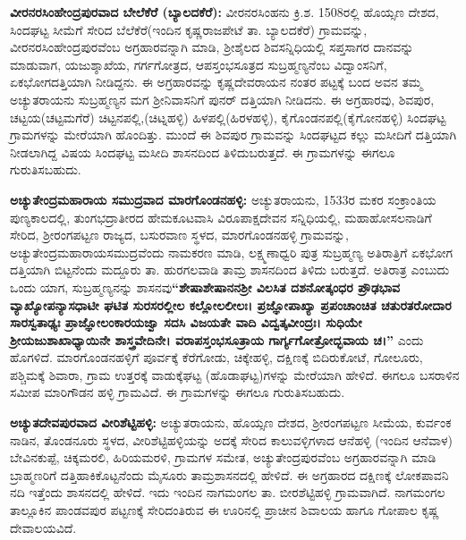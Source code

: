\textbf{ವೀರನರಸಿಂಹೇಂದ್ರಪುರವಾದ ಬೇಲೆಕೆರೆ (ಬ್ಯಾಲದಕೆರೆ): } ವೀರನರಸಿಂಹನು ಕ್ರಿ.ಶ. 1508ರಲ್ಲಿ ಹೊಯ್ಸಣ ದೇಶದ, ಸಿಂದಘಟ್ಟ ಸೀಮೆಗೆ ಸೇರಿದ ಬೆಲೆಕೆರೆ(ಇಂದಿನ ಕೃಷ್ಣರಾಜಪೇಟೆ ತಾ. ಬ್ಯಾಲದಕೆರೆ) ಗ್ರಾಮವನ್ನು, ವೀರನರಸಿಂಹೇಂದ್ರಪುರವೆಂಬ ಅಗ್ರಹಾರವನ್ನಾಗಿ ಮಾಡಿ, ಶ‍್ರೀಶೈಲದ ಶಿವಸನ್ನಿಧಿಯಲ್ಲಿ ಸಪ್ತಸಾಗರ ದಾನವನ್ನು ಮಾಡುವಾಗ, ಯಜುಶ್ಶಾಖೆಯ, ಗರ್ಗಗೋತ್ರದ, ಆಪಸ್ತಂಭ\-ಸೂತ್ರದ ಸುಬ್ರಹ್ಮಣ್ಯನೆಂಬ ವಿದ್ವಾಂಸನಿಗೆ, ಏಕಭೋಗದತ್ತಿಯಾಗಿ ನೀಡಿದ್ದನು. ಈ ಅಗ್ರಹಾರವನ್ನು ಕೃಷ್ಣದೇವರಾಯನ ನಂತರ ಪಟ್ಟಕ್ಕೆ ಬಂದ ಅವನ ತಮ್ಮ ಅಚ್ಯುತರಾಯನು ಸುಬ್ರಹ್ಮಣ್ಯನ ಮಗ ಶ‍್ರೀನಿವಾಸನಿಗೆ ಪುನರ್​ ದತ್ತಿಯಾಗಿ ನೀಡಿದನು. ಈ ಅಗ್ರಹಾರವು, ಶಿವಪುರ, ಚಟ್ಟಯ(ಚಟ್ಟಮಗೆರೆ) ಚಿಟ್ಟನಪಲ್ಲಿ,(ಚಿಟ್ನಹಳ್ಳಿ) ಹಿಳಪಲ್ಲಿ(ಹಿರಳಹಳ್ಳಿ), ಕೈಗೊಂಡನಪಲ್ಲಿ(ಕೈಗೋನಹಳ್ಳಿ) ಸಿಂದಘಟ್ಟ ಗ್ರಾಮಗಳನ್ನು ಮೇರೆಯಾಗಿ ಹೊಂದಿತ್ತು. ಮುಂದೆ ಈ ಶಿವಪುರ ಗ್ರಾಮವನ್ನು ಸಿಂದಘಟ್ಟದ ಕಲ್ಲು ಮಸೀದಿಗೆ ದತ್ತಿಯಾಗಿ ನೀಡಲಾಗಿದ್ದ ವಿಷಯ ಸಿಂದಘಟ್ಟ ಮಸೀದಿ ಶಾಸನದಿಂದ ತಿಳಿದುಬರುತ್ತದೆ. ಈ ಗ್ರಾಮಗಳನ್ನು ಈಗಲೂ ಗುರುತಿಸಬಹುದು.

\textbf{ಅಚ್ಯುತೇಂದ್ರಮಹಾರಾಯ ಸಮುದ್ರವಾದ ಮಾರಗೊಂಡನಹಳ್ಳಿ:} ಅಚ್ಯುತರಾಯನು, 1533ರ ಮಕರ ಸಂಕ್ರಾಂತಿಯ ಪುಣ್ಯಕಾಲದಲ್ಲಿ, ತುಂಗಭದ್ರಾತೀರದ ಹೇಮಕೂಟವಾಸಿ ವಿರೂಪಾಕ್ಷದೇವನ ಸನ್ನಿಧಿಯಲ್ಲಿ, ಮಹಾಹೋಸಲನಾಡಿಗೆ ಸೇರಿದ, ಶ‍್ರೀರಂಗಪಟ್ಟಣ ರಾಜ್ಯದ, ಬಸುರವಾಣ ಸ್ಥಳದ, ಮಾರಗೊಂಡನಹಳ್ಳಿ ಗ್ರಾಮವನ್ನು, ಅಚ್ಯುತೇಂದ್ರಮಹಾರಾಯಸಮುದ್ರ\-ವೆಂದು ನಾಮಕರಣ ಮಾಡಿ, ಲಕ್ಷ್ಮಣಾಧ್ವರಿ ಪುತ್ರ ಸುಬ್ರಹ್ಮಣ್ಯ ಅತಿರಾತ್ರಿಗೆ ಏಕಭೋಗ ದತ್ತಿಯಾಗಿ ಬಿಟ್ಟನೆಂದು ಮದ್ದೂರು ತಾ. ಹುರಗಲವಾಡಿ ತಾಮ್ರ ಶಾಸನದಿಂದ ತಿಳಿದು ಬರುತ್ತದೆ. ಅತಿರಾತ್ರ ಎಂಬುದು ಒಂದು ಯಾಗ, ಸುಬ್ರಹ್ಮಣ್ಯನನ್ನು ಶಾಸನವು\break \textbf{“ಶೇಷಾಶೇಷಾನನಶ‍್ರೀ ವಿಲಸಿತ ದಶನೋತ್ಕಂಧರ ಪ್ರೌಢಭಾವ ವ್ಯಾಖ್ಯೋಪನ್ಯಾಸಧಾಟೀ ಘಟಿತ ಸುರಸರಲ್ಲೀಲ ಕಲ್ಲೋಲಲೀಲಃ। ಪ್ರಜ್ಞೋಪಾಖ್ಯಾ ಪ್ರಪಂಚಾಂಚಿತ ಚತುರತರೋದಾರ ಸಾರಸ್ವತಾಢ್ಯಃ ಪ್ರಾಜ್ಞೋಲಂಕಾರಯಜ್ವಾ ಸದಸಿ ವಿಜಯತೇ ವಾದಿ ವಿದ್ವತ್ಕವೀಂದ್ರಃ। ಸುಧಿಯೇ ಶ‍್ರೀಯಜುಶಾಖಾಧ್ಯಾಯಿನೇ ಶಾಸ್ತ್ರವೇದಿನೇ। ವರಾಪಸ್ತಂಭಸೂತ್ರಾಯ ಗಾರ್ಗ್ಯಗೋತ್ರೋದ್ಭವಾಯ ಚ।”} ಎಂದು ಹೊಗಳಿದೆ. ಮಾರಗೊಂಡನಹಳ್ಳಿಗೆ ಪೂರ್ವಕ್ಕೆ ಕೆರೆಗೋಡು, ಚಿಕ್ಕೇಹಳ್ಳಿ, ದಕ್ಷಿಣಕ್ಕೆ ಬಿದಿರುಕೋಟೆ, ಗೋಲೂರು, ಪಶ್ಚಿಮಕ್ಕೆ ಶಿವಾರಾ, ಗ್ರಾಮ ಉತ್ತರಕ್ಕೆ ವಾಡುಕ್ಕೆಘಟ್ಟ (ಹೊಡಾಘಟ್ಟ)ಗಳನ್ನು ಮೇರೆಯಾಗಿ ಹೇಳಿದೆ. ಈಗಲೂ ಬಸರಾಳಿನ ಸಮೀಪ ಮಾರಿಗೌಡನ ಹಳ್ಳಿ ಗ್ರಾಮವಿದೆ. ಈ ಗ್ರಾಮಗಳನ್ನು ಈಗಲೂ ಗುರುತಿಸಬಹುದು.

\textbf{ಅಚ್ಯುತದೇವಪುರವಾದ ವೀರಿಶೆಟ್ಟಿಹಳ್ಳಿ:} ಅಚ್ಯುತರಾಯನು, ಹೊಯ್ಸಣ ದೇಶದ, ಶ‍್ರೀರಂಗಪಟ್ಟಣ ಸೀಮೆಯ, ಕುರ್ವಂಕ ನಾಡಿನ, ತೊಂಡನೂರು ಸ್ಥಳದ, ವೀರಿಶೆಟ್ಟಿಹಳ್ಳಿಯನ್ನು ಅದಕ್ಕೆ ಸೇರಿದ ಕಾಲುವಳ್ಳಿಗಳಾದ ಆನೆಹಳ್ಳಿ (ಇಂದಿನ ಆನೆವಾಳ) ಬೇವಿನಕುಪ್ಪೆ, ಚಿಕ್ಕಮರಲಿ, ಹಿರಿಯಮರಳಿ, ಗ್ರಾಮಗಳ ಸಮೇತ, ಅಚ್ಯುತೇಂದ್ರಪುರವೆಂಬ ಅಗ್ರಹಾರವನ್ನಾಗಿ ಮಾಡಿ ಬ್ರಾಹ್ಮಣರಿಗೆ ದತ್ತಿಹಾಕಿಕೊಟ್ಟನೆಂದು ಮೈಸೂರು ತಾಮ್ರಶಾಸನದಲ್ಲಿ ಹೇಳಿದೆ. ಈ ಅಗ್ರಹಾರದ ದಕ್ಷಿಣಕ್ಕೆ ಲೋಕಪಾವನಿ ನದಿ ಇತ್ತೆಂದು ಶಾಸನದಲ್ಲಿ ಹೇಳಿದೆ. ಇದು ಇಂದಿನ ನಾಗಮಂಗಲ ತಾ. ಬೀರಶೆಟ್ಟಿಹಳ್ಳಿ ಗ್ರಾಮವಾಗಿದೆ. ನಾಗಮಂಗಲ ತಾಲ್ಲೂಕಿನ ಪಾಂಡವಪುರ ಪಟ್ಟಣಕ್ಕೆ ಸೇರಿದಂತಿರುವ ಈ ಊರಿನಲ್ಲಿ ಪ್ರಾಚೀನ ಶಿವಾಲಯ ಹಾಗೂ ಗೋಪಾಲ ಕೃಷ್ಣ ದೇವಾಲಯವಿದೆ.

